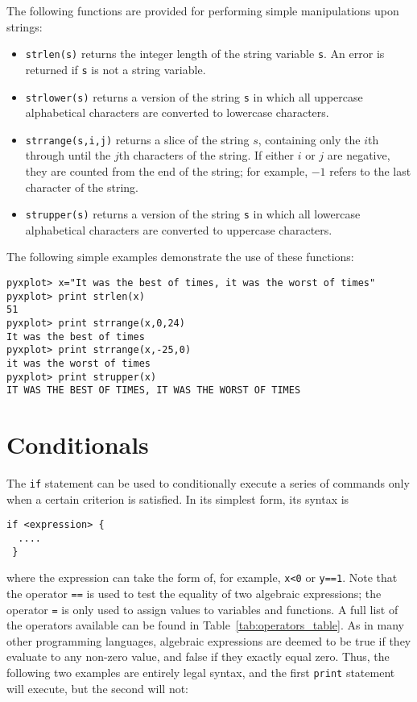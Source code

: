 The following functions are provided for performing simple manipulations upon
strings:

\noindent
\begin{itemize}
\item {\tt strlen(s)} returns the integer length of the string variable {\tt s}. An error is returned if {\tt s} is not a string variable.
\item {\tt strlower(s)} returns a version of the string {\tt s} in which all uppercase alphabetical characters are converted to lowercase characters.
\item {\tt strrange(s,i,j)} returns a slice of the string $s$, containing only the $i$th through until the $j$th characters of the string. If either $i$ or $j$ are negative, they are counted from the end of the string; for example, $-1$ refers to the last character of the string.
\item {\tt strupper(s)} returns a version of the string {\tt s} in which all lowercase alphabetical characters are converted to uppercase characters.
\end{itemize}

\noindent
The following simple examples demonstrate the use of these functions:
\begin{verbatim}
pyxplot> x="It was the best of times, it was the worst of times"
pyxplot> print strlen(x)
51
pyxplot> print strrange(x,0,24)
It was the best of times
pyxplot> print strrange(x,-25,0)
it was the worst of times
pyxplot> print strupper(x)
IT WAS THE BEST OF TIMES, IT WAS THE WORST OF TIMES
\end{verbatim}

\section{Conditionals}

The {\tt if} statement can be used to conditionally execute a series
of commands only when a certain criterion is satisfied. In its simplest form,
its syntax is

\begin{verbatim}
if <expression> {
  ....
 }
\end{verbatim}

\noindent where the expression can take the form of, for example, {\tt x<0} or
{\tt y==1}. Note that the operator {\tt ==} is used to test the equality of two
algebraic expressions; the operator {\tt =} is only used to assign values to
variables and functions. A full list of the operators available can be found in
Table~\ref{tab:operators_table}. As in many other programming languages,
algebraic expressions are deemed to be true if they evaluate to any non-zero
value, and false if they exactly equal zero. Thus, the following two examples
are entirely legal syntax, and the first {\tt print} statement will execute,
but the second will not:

